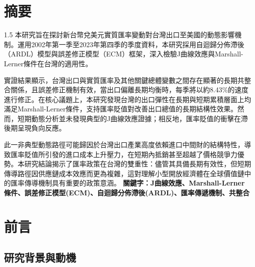 \documentclass[a4paper,12pt]{article}
\begin{document}
\newpage

\setcounter{page}{1}
\section*{\centering 摘要}
\vspace{0.5cm}
\begin{spacing}{1.5}
本研究旨在探討新台幣兌美元實質匯率變動對台灣出口至美國的動態影響機制。運用2002年第一季至2023年第四季的季度資料，本研究採用自迴歸分佈滯後（ARDL）模型與誤差修正模型（ECM）框架，深入檢驗J曲線效應與Marshall-Lerner條件在台灣的適用性。

實證結果顯示，台灣出口與實質匯率及其他關鍵總體變數之間存在顯著的長期共整合關係，且誤差修正機制有效，當出口偏離長期均衡時，每季將以約8.43\%的速度進行修正。在核心議題上，本研究發現台灣的出口彈性在長期與短期累積層面上均滿足Marshall-Lerner條件，支持匯率貶值對改善出口總值的長期結構性效果。然而，短期動態分析並未發現典型的J曲線效應證據；相反地，匯率貶值的衝擊在滯後期呈現負向反應。

此一非典型動態路徑可能歸因於台灣出口產業高度依賴進口中間財的結構特性，導致匯率貶值所引發的進口成本上升壓力，在短期內抵銷甚至超越了價格競爭力優勢。本研究結論揭示了匯率政策在台灣的雙重性：儘管其具備長期有效性，但短期傳導路徑因供應鏈成本效應而更為複雜，這對理解小型開放經濟體在全球價值鏈中的匯率傳導機制具有重要的政策意涵。
\textbf{關鍵字：J曲線效應、Marshall-Lerner條件、誤差修正模型(ECM)、自迴歸分佈滯後(ARDL)、匯率傳遞機制、共整合}
\end{spacing}


\newpage

\section{前言}
\subsection{研究背景與動機}
\end{document}
